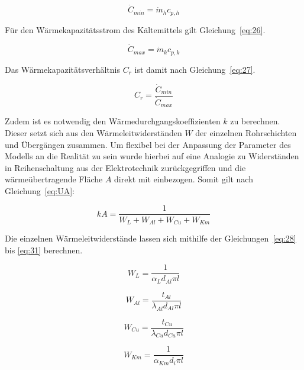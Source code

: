 \begin{equation}
\label{eq:25}
\dot{C}_{min} = \dot{m}_h c_{p,h}
\end{equation} 

Für den Wärmekapazitätsstrom des Kältemittels gilt Gleichung~\ref{eq:26}.

\begin{equation}
\label{eq:26}
\dot{C}_{max} = \dot{m}_k c_{p,k}
\end{equation}
 
Das Wärmekapazitätsverhältnis $C_r$ ist damit nach Gleichung~\ref{eq:27}.
 
\begin{equation}
\label{eq:27}
C_r = \frac{\dot{C}_{min}}{\dot{C}_{max}}
\end{equation}

Zudem ist es notwendig den Wärmedurchgangskoeffizienten $k$ zu berechnen\cite{LehrstuhlfurWarmeundStoffubertragung.}. Dieser setzt sich aus den Wärmeleitwiderständen $W$ der einzelnen Rohrschichten und Übergängen zusammen. Um flexibel bei der Anpassung der Parameter des Modells an die Realität zu sein wurde hierbei auf eine Analogie zu Widerständen in Reihenschaltung aus der Elektrotechnik zurückgegriffen und die wärmeübertragende Fläche $A$ direkt mit einbezogen. Somit gilt nach Gleichung~\ref{eq:UA}:

\begin{equation}
\label{eq:UA}
kA = \frac{1}{W_{L} + W_{Al} + W_{Cu} + W_{Km}}
\end{equation}
 
Die einzelnen Wärmeleitwiderstände lassen sich mithilfe der Gleichungen~\ref{eq:28} bis \ref{eq:31} berechnen.

\begin{equation}
\label{eq:28}
W_L = \frac{1}{\alpha_{L} d_{Al} \pi l}
\end{equation}

\begin{equation}
\label{eq:29}
W_{Al} = \frac{t_{Al}}{\lambda_{Al} d_{Al} \pi l}
\end{equation}

\begin{equation}
\label{eq:30}
W_{Cu} = \frac{t_{Cu}}{\lambda_{Cu} d_{Cu} \pi l}
\end{equation}

\begin{equation}
\label{eq:31}
W_{Km} = \frac{1}{\alpha_{Km} d_{i} \pi l}
\end{equation}

